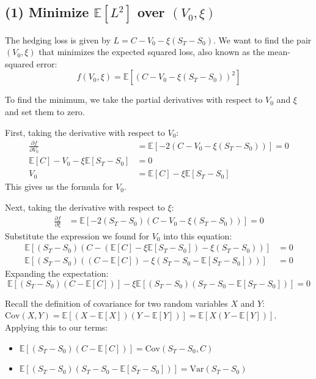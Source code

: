 \subsection*{(1) Minimize $\mathbb{E}[L^2]$ over $(V_0, \xi)$}

The hedging loss is given by $L = C - V_0 - \xi(S_T - S_0)$. We want to find the pair $(V_0, \xi)$ that minimizes the expected squared loss, also known as the mean-squared error:
\begin{equation*}
f(V_0, \xi) = \mathbb{E}[(C - V_0 - \xi(S_T - S_0))^2]
\end{equation*}

To find the minimum, we take the partial derivatives with respect to $V_0$ and $\xi$ \textendash{} and set them to zero.

First, taking the derivative with respect to $V_0$:
\begin{align*}
\frac{\partial f}{\partial V_0} &= \mathbb{E}[-2(C - V_0 - \xi(S_T - S_0))] = 0 \\
\mathbb{E}[C] - V_0 - \xi\mathbb{E}[S_T - S_0] &= 0 \\
V_0 &= \mathbb{E}[C] - \xi\mathbb{E}[S_T - S_0]
\end{align*}
This gives us the formula for $V_0$. 

Next, taking the derivative with respect to $\xi$:
\begin{align*}
\frac{\partial f}{\partial \xi} &= \mathbb{E}[-2(S_T - S_0)(C - V_0 - \xi(S_T - S_0))] = 0
\end{align*}
Substitute the expression we found for $V_0$ into this equation:
\begin{align*}
\mathbb{E}\left[(S_T - S_0)\left(C - (\mathbb{E}[C] - \xi\mathbb{E}[S_T - S_0]) - \xi(S_T - S_0)\right)\right] &= 0 \\
\mathbb{E}\left[(S_T - S_0)\left((C - \mathbb{E}[C]) - \xi(S_T - S_0 - \mathbb{E}[S_T - S_0])\right)\right] &= 0
\end{align*}
Expanding the expectation:
\begin{equation*}
\mathbb{E}[(S_T - S_0)(C - \mathbb{E}[C])] - \xi\mathbb{E}[(S_T - S_0)(S_T - S_0 - \mathbb{E}[S_T - S_0])] = 0
\end{equation*}

Recall the definition of covariance for two random variables $X$ and $Y$: $\text{Cov}(X,Y) = \mathbb{E}[(X - \mathbb{E}[X])(Y - \mathbb{E}[Y])] = \mathbb{E}[X(Y - \mathbb{E}[Y])]$.
Applying this to our terms:
\begin{itemize}
    \item $\mathbb{E}[(S_T - S_0)(C - \mathbb{E}[C])] = \text{Cov}(S_T - S_0, C)$
    \item $\mathbb{E}[(S_T - S_0)(S_T - S_0 - \mathbb{E}[S_T - S_0])] = \text{Var}(S_T - S_0)$
\end{itemize}

